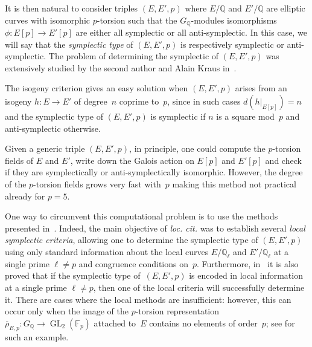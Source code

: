 \documentclass[12pt]{amsart}
\newcommand{\F}{\mathbb{F}}
\newcommand{\Q}{\mathbb{Q}}
\newcommand{\Z}{\mathbb{Z}}
\newcommand{\rhobar}{{\overline{\rho}}}
\newcommand{\GL}{\operatorname{GL}}
\numberwithin{equation}{section}
\theoremstyle{definition}
\theoremstyle{remark}
\begin{document}
\begin{comment}
both have $5$-torsion Galois module isomorphic to $\mu_5
\times \Z/5\Z$.  Now let $P,Q \in E[5]$ and $P',Q' \in E'[5]$ be bases
such that $P$, $P'$ are defined over~$\Q$.  The map defined by $P
\mapsto P'$ and $Q \mapsto n\cdot Q'$ (with $5 \nmid n$) is a
$G_\Q$-isomorphism which is symplectic if and only if $n$ is a square
mod~$5$.  Moreover, the automorphism $\alpha$ of $E[5]$ given by
$\alpha(P) = P$ and $\alpha(Q) = 2Q$ is anti-symplectic because $2$ is
not a square modulo~$5$.
\end{comment}

It is then natural to consider triples $(E,E',p)$ where $E/\Q$ and $E'/\Q$ are elliptic
curves with isomorphic $p$-torsion such that the $G_\Q$-modules
isomorphisms $\phi : E[p] \rightarrow E'[p]$ are either all symplectic
or all anti-symplectic.  In this case, we will say that the {\em
  symplectic type} of $(E,E',p)$ is respectively symplectic or
anti-symplectic.  The problem of determining the symplectic of
$(E,E',p)$ was extensively studied by the second author and Alain
Kraus in~\cite{FKSym}.

The isogeny criterion gives an easy solution when $(E,E',p)$
arises from an isogeny $h \colon E \to E'$ of degree~$n$ coprime
to~$p$, since in such cases $d(h|_{E[p]}) = n$ and the symplectic type
of $(E,E',p)$ is symplectic if $n$ is a square mod~$p$ and
anti-symplectic otherwise.

Given a generic triple $(E, E', p)$, in principle, one
could compute the $p$-torsion fields of $E$ and $E'$,
write down the Galois action on $E[p]$ and $E'[p]$ and check if they
are symplectically or anti-symplectically isomorphic. However, the
degree of the $p$-torsion fields grows very fast with~$p$ making this
method not practical already for $p = 5$.

One way to circumvent this computational problem is to use the methods
presented in~\cite{FKSym}. Indeed, the main objective of {\it
  loc. cit.} was to establish several {\em local symplectic criteria},
allowing one to determine the symplectic type of $(E,E',p)$ using only
standard information about the local curves $E/\Q_\ell$ and
$E'/\Q_\ell$ at a single prime $\ell \neq p$ and congruence conditions
on~$p$. Furthermore, in~\cite{FKSym} it is also proved that if the
symplectic type of~$(E,E',p)$ is encoded in local information at a
single prime $\ell \neq p$, then one of the local criteria will
successfully determine it.  
There are cases where the local methods
are insufficient: however, this can occur only when the image
of the $p$-torsion representation~$\rhobar_{E,p} : G_\Q \to \GL_2(\F_p)$ attached to~$E$ contains no elements of order~$p$;
see \cite[Proposition~16]{FKSym} for such an example.
\end{document}
